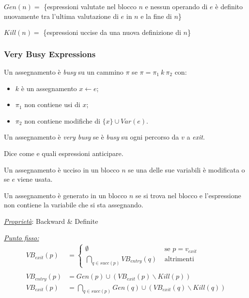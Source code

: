 \documentclass[a4paper, 11pt]{report}
\begin{document}
$Gen(n) = $ \{espressioni valutate nel blocco $n$ e nessun operando di $e$ è definito nuovamente tra l'ultima valutazione di $e$ in $n$ e la fine di $n$\}

$Kill(n) = $ \{espressioni uccise da una nuova definizione di $n$\}

\noindent


\newpage
\subsubsection*{Very Busy Expressions}
Un assegnamento è \textit{busy} su un cammino $\pi$ se $\pi = \pi_1 ~k~ \pi_2$ con:
\begin{itemize}
	\item $k$ è un assegnamento $x\leftarrow e$;
	\item $\pi_1$ non contiene usi di $x$;
	\item $\pi_2$ non contiene modifiche di $\{x\}\cup Var(e)$.
\end{itemize}

\noindent
Un assegnamento è \textit{very busy} se è \textit{busy} su ogni percorso da $v$ a \textit{exit}.

\noindent
Dice come e quali espressioni anticipare.

\noindent
Un assegnamento è ucciso in un blocco $n$ se una delle sue variabili è modificata o se $e$ viene usata.

\noindent
Un assegnamento è generato in un blocco $n$ se si trova nel blocco e l'espressione non contiene la variabile che si sta assegnando.
\newline

\noindent
\textit{\underline{Proprietà}}: Backward \& Definite
\newline

\noindent
\underline{\textit{Punto fisso:}}
\begin{align*}
VB_{exit}(p) &= 
\begin{cases}
\emptyset &\text{ se } p = v_{exit} \\
\bigcap_{q\in succ(p)} VB_{entry}(q) &\text{ altrimenti}
\end{cases}\\ \\
VB_{entry}(p) &= Gen(p) \cup (VB_{exit}(p)\backslash Kill(p))\\
VB_{exit}(p) &= \bigcap_{q\in succ(p)} Gen(q) \cup (VB_{exit}(q)\backslash Kill(q))
\end{align*}
\end{document}
